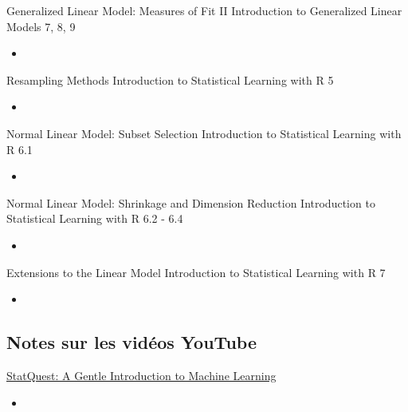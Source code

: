 \documentclass[12pt, titlepage, french]{report}
\begin{document}
\begin{CHPT_SUMM_AUTO_NUMB}[label = {L.-52}]{Generalized Linear Model: Measures of Fit II}
Introduction to Generalized Linear Models 7, 8, 9
	\begin{itemize}
		\item	
	\end{itemize}
\end{CHPT_SUMM_AUTO_NUMB}

\begin{CHPT_SUMM_AUTO_NUMB}[label = {L.-53}]{Resampling Methods}
Introduction to Statistical Learning with R 5
	\begin{itemize}
		\item	
	\end{itemize}
\end{CHPT_SUMM_AUTO_NUMB}

\begin{CHPT_SUMM_AUTO_NUMB}[label = {L.-54}]{Normal Linear Model: Subset Selection}
Introduction to Statistical Learning with R 6.1
	\begin{itemize}
		\item	
	\end{itemize}
\end{CHPT_SUMM_AUTO_NUMB}

\begin{CHPT_SUMM_AUTO_NUMB}[label = {L.-55}]{Normal Linear Model: Shrinkage and Dimension Reduction}
Introduction to Statistical Learning with R 6.2 - 6.4
	\begin{itemize}
		\item	
	\end{itemize}
\end{CHPT_SUMM_AUTO_NUMB}

\begin{CHPT_SUMM_AUTO_NUMB}[label = {L.-56}]{Extensions to the Linear Model}
Introduction to Statistical Learning with R 7
	\begin{itemize}
		\item	
	\end{itemize}
\end{CHPT_SUMM_AUTO_NUMB}

\subsection{Notes sur les vidéos YouTube}

\begin{YTB_SUMM}[label = {SQ-BASICS-ML-INTRO}]{\href{https://www.youtube.com/watch?v=Gv9_4yMHFhI&list=PLblh5JKOoLUICTaGLRoHQDuF_7q2GfuJF&index=2&t=0s}{StatQuest: A Gentle Introduction to Machine Learning}}
\begin{itemize}
	\item	
\end{itemize}
\end{YTB_SUMM}
\end{document}
